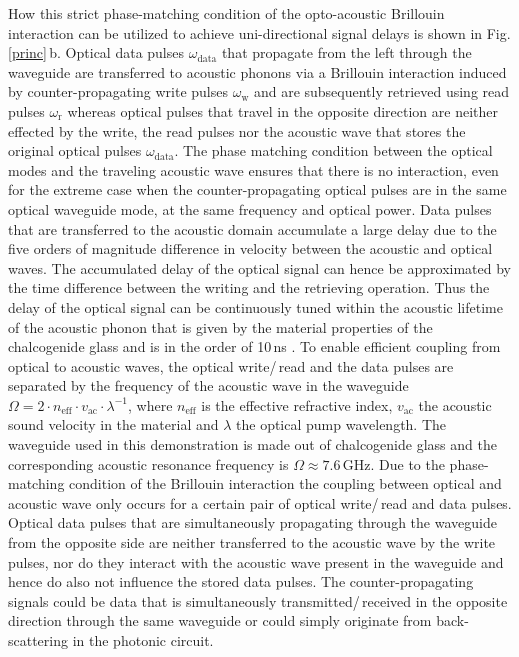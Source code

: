 \documentclass[superscriptaddress, nofootinbib, twocolumn, amsmath,amssymb, aps, pra, notitlepage, longbibliography]{revtex4-1}
\begin{document}
How this strict phase-matching condition of the opto-acoustic Brillouin interaction can be utilized to achieve uni-directional signal delays is shown in Fig. \ref{princ}\,b. Optical data pulses \(\omega_\mathrm{data}\) that propagate from the left through the waveguide are transferred to acoustic phonons via a Brillouin interaction induced by counter-propagating write pulses \(\omega_\mathrm{w}\) and are subsequently retrieved using read pulses \(\omega_\mathrm{r}\) \cite{Merklein2017,Zhu2007,Merklein2018} whereas optical pulses that travel in the opposite direction are neither effected by the write, the read pulses nor the acoustic wave that stores the original optical pulses \(\omega_\mathrm{data}\). The phase matching condition between the optical modes and the traveling acoustic wave ensures that there is no interaction, even for the extreme case when the counter-propagating optical pulses are in the same optical waveguide mode, at the same frequency and optical power. \newline
Data pulses that are transferred to the acoustic domain accumulate a large delay due to the five orders of magnitude difference in velocity between the acoustic and optical waves. The accumulated delay of the optical signal can hence be approximated by the time difference between the writing and the retrieving operation. Thus the delay of the optical signal can be continuously tuned within the acoustic lifetime of the acoustic phonon that is given by the material properties of the chalcogenide glass and is in the order of 10\,ns \cite{Merklein2017}.  \newline
To enable efficient coupling from optical to acoustic waves, the optical write/\,read and the data pulses are separated by the frequency of the acoustic wave in the waveguide \(\Omega = 2 \cdot n_\mathrm{eff} \cdot v_\mathrm{ac} \cdot \lambda^{-1}\), where \(n_\mathrm{eff}\) is the effective refractive index, \(v_\mathrm{ac}\) the acoustic sound velocity in the material and \(\lambda\) the optical pump wavelength. The waveguide used in this demonstration is made out of chalcogenide glass and the corresponding acoustic resonance frequency is \(\Omega \approx 7.6\,\mathrm{GHz}\). \newline
Due to the phase-matching condition of the Brillouin interaction the coupling between optical and acoustic wave only occurs for a certain pair of optical write/\,read and data pulses. Optical data pulses that are simultaneously propagating through the waveguide from the opposite side are neither transferred to the acoustic wave by the write pulses, nor do they interact with the acoustic wave present in the waveguide and hence do also not influence the stored data pulses. The counter-propagating signals could be data that is simultaneously transmitted/\,received in the opposite direction through the same waveguide or could simply originate from back-scattering in the photonic circuit. \newline
\end{document}
